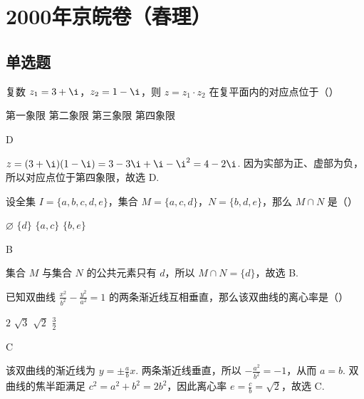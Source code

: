 \chapter{2000年京皖卷（春理）}
\section{单选题}
\begin{problem}
复数 \(z_{1} = 3 + \i\)，\(z_{2} = 1 - \i\)，则 \(z = z_{1} \cdot z_{2}\) 在复平面内的对应点位于（\quad）

\choices
    {第一象限}
    {第二象限}
    {第三象限}
    {第四象限}
\end{problem}

\begin{answer}
D
\end{answer}

\begin{solution}
\(z=(3+\i)(1-\i)=3-3\i+\i-\i^{2}=4-2\i\). 因为实部为正、虚部为负，所以对应点位于第四象限，故选 D.
\end{solution}

\begin{problem}
设全集 \(I = \{a, b, c, d, e\}\)，集合 \(M = \{a, c, d\}\)，\(N = \{b, d, e\}\)，那么 \(M \cap N\) 是（\quad）

\choices
    {\(\varnothing\)}
    {\(\{d\}\)}
    {\(\{a, c\}\)}
    {\(\{b, e\}\)}
\end{problem}

\begin{answer}
B
\end{answer}

\begin{solution}
集合 \(M\) 与集合 \(N\) 的公共元素只有 \(d\)，所以 \(M\cap N=\{d\}\)，故选 B.
\end{solution}

\begin{problem}
已知双曲线 \(\frac{x^{2}}{b^{2}} - \frac{y^{2}}{a^{2}} = 1\) 的两条渐近线互相垂直，那么该双曲线的离心率是（\quad）

\choices
    {\(2\)}
    {\(\sqrt{3}\)}
    {\(\sqrt{2}\)}
    {\(\frac{3}{2}\)}
\end{problem}

\begin{answer}
C
\end{answer}

\begin{solution}
该双曲线的渐近线为 \(y=\pm\frac{a}{b}x\). 两条渐近线垂直，所以 \(-\frac{a^{2}}{b^{2}}=-1\)，从而 \(a=b\). 双曲线的焦半距满足 \(c^{2}=a^{2}+b^{2}=2b^{2}\)，因此离心率 \(e=\frac{c}{b}=\sqrt{2}\)，故选 C.
\end{solution}

